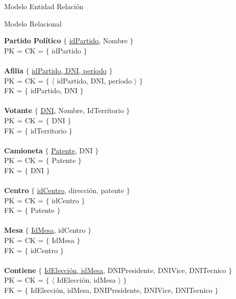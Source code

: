 \begin{section}{Modelo Entidad Relaci\'on}

\begin{subsection}{Modelo Relacional}

\noindent \textbf{Partido Pol\'itico} $\lbrace$ \underline{idPartido}, Nombre $\rbrace$ \\
PK = CK = $ \lbrace $ idPartido $ \rbrace $ \\
\\
\textbf{Afilia} $ \lbrace $ \underline{idPartido, DNI, per\'iodo} $ \rbrace $\\
PK = CK = $ \lbrace $ $ \langle $ idPartido, DNI, per\'iodo $ \rangle $  $ \rbrace $\\
FK = $ \lbrace $ idPartido, DNI $ \rbrace $\\
\\
\textbf{Votante} $ \lbrace $ \underline{DNI}, Nombre, IdTerritorio $ \rbrace $\\
PK = CK = $ \lbrace $ DNI $ \rbrace $\\
FK = $ \lbrace $ idTerritorio $ \rbrace $\\
\\
\textbf{Camioneta} $ \lbrace $ \underline{Patente}, DNI $ \rbrace $\\
PK = CK = $ \lbrace $ Patente  $ \rbrace $\\
FK = $ \lbrace $ DNI $ \rbrace $\\
\\
\textbf{Centro} $ \lbrace $ \underline{idCentro}, direcci\'on, patente $ \rbrace $ \\
PK = CK = $ \lbrace $ idCentro $ \rbrace $ \\
FK = $ \lbrace $ Patente $ \rbrace $\\
\\
\textbf{Mesa} $ \lbrace $ \underline{IdMesa}, idCentro $ \rbrace $ \\
PK = CK = $ \lbrace $ IdMesa $ \rbrace $ \\
FK = $ \lbrace $ idCentro $ \rbrace $\\
\\
\textbf{Contiene} $ \lbrace $ \underline{IdElecci\'on, idMesa}, DNIPresidente, DNIVice, DNITecnico $ \rbrace $ \\
PK = CK = $ \lbrace $ $ \langle $ IdElecci\'on, idMesa $ \rangle $ $ \rbrace $ \\
FK = $ \lbrace $ IdElecci\'on, idMesa, DNIPresidente, DNIVice, DNITecnico $ \rbrace $\\
\\

\end{subsection}
\end{section}

